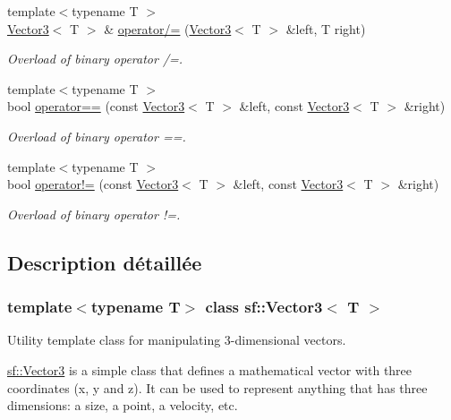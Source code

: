 \begin{DoxyCompactItemize}
{\footnotesize template$<$typename T $>$ }\\\hyperlink{classsf_1_1Vector3}{Vector3}$<$ T $>$ \& \hyperlink{classsf_1_1Vector3_a8995a700f9dffccc6dddb3696ae17b64}{operator/=} (\hyperlink{classsf_1_1Vector3}{Vector3}$<$ T $>$ \&left, T right)
\begin{DoxyCompactList}\small\item\em Overload of binary operator /=. \end{DoxyCompactList}\item 
{\footnotesize template$<$typename T $>$ }\\bool \hyperlink{classsf_1_1Vector3_a388d72db973306a35ba467016b3dee30}{operator==} (const \hyperlink{classsf_1_1Vector3}{Vector3}$<$ T $>$ \&left, const \hyperlink{classsf_1_1Vector3}{Vector3}$<$ T $>$ \&right)
\begin{DoxyCompactList}\small\item\em Overload of binary operator ==. \end{DoxyCompactList}\item 
{\footnotesize template$<$typename T $>$ }\\bool \hyperlink{classsf_1_1Vector3_a608500d1ad3b78082cb5bb4356742bd4}{operator!=} (const \hyperlink{classsf_1_1Vector3}{Vector3}$<$ T $>$ \&left, const \hyperlink{classsf_1_1Vector3}{Vector3}$<$ T $>$ \&right)
\begin{DoxyCompactList}\small\item\em Overload of binary operator !=. \end{DoxyCompactList}\end{DoxyCompactItemize}


\subsection{Description détaillée}
\subsubsection*{template$<$typename T$>$\newline
class sf\+::\+Vector3$<$ T $>$}

Utility template class for manipulating 3-\/dimensional vectors. 

\hyperlink{classsf_1_1Vector3}{sf\+::\+Vector3} is a simple class that defines a mathematical vector with three coordinates (x, y and z). It can be used to represent anything that has three dimensions\+: a size, a point, a velocity, etc.

